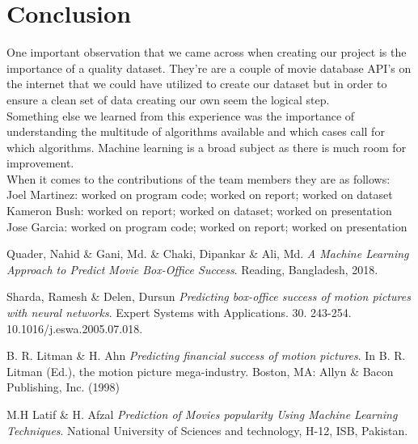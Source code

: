 \documentclass[10pt,twocolumn,letterpaper]{article}
\begin{document}
\section{Conclusion}
	One important observation that we came across when creating our project is the
	importance of a quality dataset. They're are a couple of movie database API's on the internet
	that we could have utilized to create our dataset but in order to ensure a clean set of
	data creating our own seem the logical step.\\
	Something else we learned from this experience was the importance of understanding the
	multitude of algorithms available and which cases call for which algorithms. Machine learning
	is a broad subject as there is much room for improvement.\\
	When it comes to the contributions of the team members they are as follows:\\
	Joel Martinez: worked on program code; worked on report; worked on dataset\\
	Kameron Bush: worked on report; worked on dataset; worked on presentation\\
	Jose Garcia: worked on program code; worked on report; worked on presentation\\

\begin{thebibliography}{9}
	Quader, Nahid \& Gani, Md. \& Chaki, Dipankar \& Ali, Md. 
	\textit{A Machine Learning Approach to Predict Movie Box-Office Success}. 
	Reading, Bangladesh, 2018.
	
	Sharda, Ramesh \& Delen, Dursun 
	\textit{Predicting box-office success of motion pictures with neural networks}. 
	Expert Systems with Applications. 30. 243-254. 10.1016/j.eswa.2005.07.018.
	
	B. R. Litman \& H. Ahn
	\textit{Predicting financial success of motion pictures}.
	In B. R. Litman (Ed.), the motion picture mega-industry. Boston, MA: Allyn \& 
	Bacon Publishing, Inc. (1998)
	
	M.H Latif \& H. Afzal
	\textit{Prediction of Movies popularity Using Machine Learning Techniques}.
	National University of Sciences and technology, H-12, ISB, Pakistan. 
\end{thebibliography}
\end{document}
